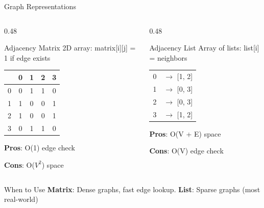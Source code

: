 \documentclass[aspectratio=169,xcolor=dvipsnames]{beamer}
\begin{document}
\begin{frame}{Graph Representations}
  \begin{columns}
    \begin{column}{0.48\textwidth}
      \begin{block}{Adjacency Matrix}
        2D array: matrix[i][j] = 1 if edge exists

        \vspace{0.2cm}

        \begin{tabular}{c|cccc}
          & 0 & 1 & 2 & 3 \\
          \hline
          0 & 0 & 1 & 1 & 0 \\
          1 & 1 & 0 & 0 & 1 \\
          2 & 1 & 0 & 0 & 1 \\
          3 & 0 & 1 & 1 & 0 \\
        \end{tabular}

        \vspace{0.2cm}

        \textbf{Pros}: O(1) edge check

        \textbf{Cons}: O($V^2$) space
      \end{block}
    \end{column}
    \begin{column}{0.48\textwidth}
      \begin{block}{Adjacency List}
        Array of lists: list[i] = neighbors

        \vspace{0.2cm}

        \begin{tabular}{cl}
          0 & $\rightarrow$ [1, 2] \\
          1 & $\rightarrow$ [0, 3] \\
          2 & $\rightarrow$ [0, 3] \\
          3 & $\rightarrow$ [1, 2] \\
        \end{tabular}

        \vspace{0.2cm}

        \textbf{Pros}: O(V + E) space

        \textbf{Cons}: O(V) edge check
      \end{block}
    \end{column}
  \end{columns}

  \vspace{0.3cm}

  \begin{alertblock}{When to Use}
    \textbf{Matrix}: Dense graphs, fast edge lookup. \textbf{List}: Sparse graphs (most real-world)
  \end{alertblock}
\end{frame}
\end{document}
